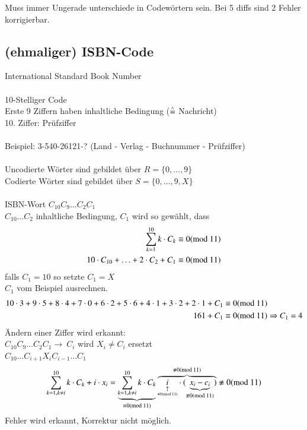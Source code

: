 Muss immer Ungerade unterschiede in Codew\"ortern sein. Bei 5 diffs sind 2 Fehler korrigierbar.

\subsection{(ehmaliger) ISBN-Code}
International Standard Book Number\\
\\
10-Stelliger Code\\
Erste 9 Ziffern haben inhaltliche Bedingung ($\stackrel{\scriptscriptstyle\wedge}{=}$ Nachricht)\\
10. Ziffer: Pr\"ufziffer\\
\\
Beispiel: 3-540-26121-? (Land - Verlag - Buchnummer - Pr\"ufziffer)\\
\\
Uncodierte W\"orter sind gebildet \"uber $R=\{0, \ldots, 9\}$\\
Codierte W\"orter sind gebildet \"uber $S=\{0, \ldots, 9, X\}$\\
\\
ISBN-Wort $C_{10}C_9\ldots C_2C_1$\\
$C_{10}\ldots C_2$ inhaltliche Bedingung, $C_1$ wird so gew\"ahlt, dass
\begin{align*}
	\sum^{10}_{k=1} k \cdot C_k &\equiv 0 (\text{mod }11)\\
	10\cdot C_{10}+\ldots + 2\cdot C_2 + C_1 &\equiv 0(\text{mod }11)
\end{align*}
falls $C_1 = 10$ so setzte $C_1 = X$\\
$C_1$ vom Beispiel ausrechnen.
\begin{align*}
	10\cdot 3+9\cdot 5+8\cdot 4+7\cdot 0+6\cdot 2+5\cdot 6+4\cdot 1+3\cdot 2+2\cdot 1+C_1 &\equiv 0 (\text{mod }11)\\
	161 + C_1 &\equiv 0 (\text{mod }11) \Rightarrow C_1 = 4
\end{align*}
\"Andern einer Ziffer wird erkannt:\\
$C_{10} C_9\ldots C_2 C_1 \rightarrow\ C_i$ wird $X_i \neq C_i$ ersetzt\\
$C_{10} \ldots C_{i+1} X_i C_{i-1} \ldots C_1$
\[
	\sum^{10}_{k=1, k \neq i} k \cdot C_k + i \cdot x_i = 
	\underbrace{\sum^{10}_{k=1, k \neq i} k \cdot C_k}_{\equiv 0 (\md{11})}
	\overbrace{
			\underset{\underset{\nequiv 0 (\md{11})}{\uparrow}}{i} 
			\cdot (\underbrace{x_i-c_i}_{\nequiv 0 (\md{11})}) 
	}^{\nequiv 0 (\md{11})}
	\nequiv 0(\md{11})	
\]
Fehler wird erkannt, Korrektur nicht m\"oglich.\\
